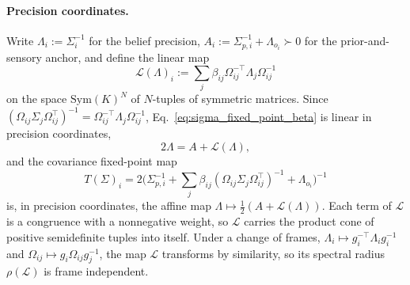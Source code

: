 \paragraph{Precision coordinates.} Write $\Lambda_i := \Sigma_i^{-1}$ for the belief precision, $A_i := \Sigma_{p,i}^{-1} + \Lambda_{o_i} \succ 0$ for the prior-and-sensory anchor, and define the linear map
\begin{equation}
\mathcal{L}(\Lambda)_i := \sum_j \beta_{ij}\Omega_{ij}^{-\top}\Lambda_j\Omega_{ij}^{-1}
\label{eq:precision_transport_map}
\end{equation}
on the space $\mathrm{Sym}(K)^N$ of $N$-tuples of symmetric matrices. Since $(\Omega_{ij}\Sigma_j\Omega_{ij}^\top)^{-1} = \Omega_{ij}^{-\top}\Lambda_j\Omega_{ij}^{-1}$, Eq.~\eqref{eq:sigma_fixed_point_beta} is linear in precision coordinates,
\begin{equation}
2\Lambda = A + \mathcal{L}(\Lambda),
\label{eq:precision_linear}
\end{equation}
and the covariance fixed-point map
\begin{equation}
T(\Sigma)_i = 2\big(\Sigma_{p,i}^{-1} + \sum_j \beta_{ij}(\Omega_{ij}\Sigma_j\Omega_{ij}^\top)^{-1} + \Lambda_{o_i}\big)^{-1}
\label{eq:sigma_fixed_point_map}
\end{equation}
is, in precision coordinates, the affine map $\Lambda \mapsto \tfrac{1}{2}(A + \mathcal{L}(\Lambda))$. Each term of $\mathcal{L}$ is a congruence with a nonnegative weight, so $\mathcal{L}$ carries the product cone of positive semidefinite tuples into itself. Under a change of frames, $\Lambda_i \mapsto g_i^{-\top}\Lambda_i g_i^{-1}$ and $\Omega_{ij} \mapsto g_i\Omega_{ij}g_j^{-1}$, the map $\mathcal{L}$ transforms by similarity, so its spectral radius $\rho(\mathcal{L})$ is frame independent.

